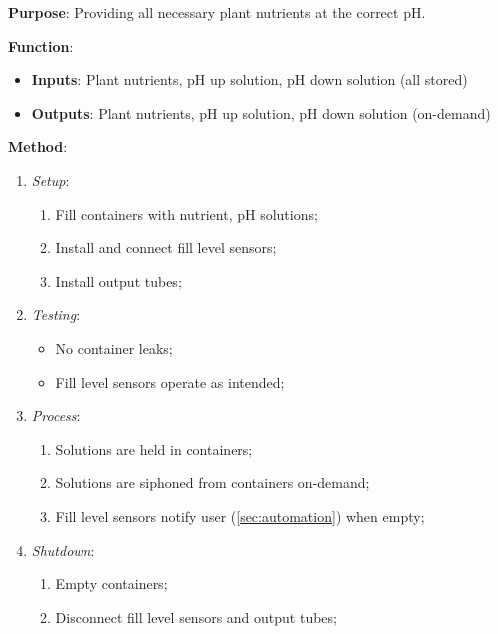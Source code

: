 \documentclass{report}
\begin{document}
\textbf{Purpose}: Providing all necessary plant nutrients at the correct pH.

\textbf{Function}:
\begin{itemize}
    \item \textbf{Inputs}: Plant nutrients, pH up solution, pH down solution (all stored)
    \item \textbf{Outputs}: Plant nutrients, pH up solution, pH down solution (on-demand)
\end{itemize}

\textbf{Method}:
\begin{enumerate}
    \item \textit{Setup}:
    \begin{enumerate}
        \item Fill containers with nutrient, pH solutions;
        \item Install and connect fill level sensors;
        \item Install output tubes;
    \end{enumerate}
    \item \textit{Testing}:
    \begin{itemize}
        \item No container leaks;
        \item Fill level sensors operate as intended;
    \end{itemize}
    \item \textit{Process}:
    \begin{enumerate}
        \item Solutions are held in containers;
        \item Solutions are siphoned from containers on-demand;
        \item Fill level sensors notify user (\ref{sec:automation}) when empty;
    \end{enumerate}
    \item \textit{Shutdown}:
    \begin{enumerate}
        \item Empty containers;
        \item Disconnect fill level sensors and output tubes;
    \end{enumerate}
\end{enumerate}
\end{document}
